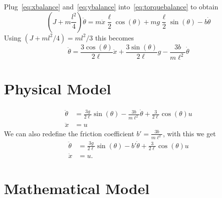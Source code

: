 \documentclass{article}
\begin{document}
Plug~\eqref{eq:xbalance} and~\eqref{eq:ybalance} into~\eqref{eq:torquebalance} to obtain
\begin{equation}
\left(J + m\frac{l^2}{4} \right) \ddot{\theta} = m \ddot{x} \frac{\ell}{2}\cos(\theta) + mg \frac{\ell}{2}\sin(\theta) - b\dot{\theta}
\end{equation}
Using $(J + ml^2/4) = ml^2/3$ this becomes
\begin{equation}
\ddot{\theta} = \frac{3 \cos(\theta)}{2 \ell} \ddot{x} + \frac{3 \sin(\theta)}{2\ell} g - \frac{3b}{m\ell^2} \dot{\theta}
\end{equation}

\section{Physical Model}
\begin{equation}
	\begin{aligned}
		\ddot{\theta} &= \frac{3g}{2\ell} \sin(\theta)    -\frac{3b}{m\ell^2} \dot{\theta}              + \frac{3}{2\ell} \cos(\theta)u\\
		\ddot{x} &= u 
	\end{aligned}
\end{equation}
We can also redefine the friction coefficient $b'=\frac{3b}{m\ell^2}$, with this we get
\begin{equation}
	\begin{aligned}
		\ddot{\theta} &= \frac{3g}{2\ell} \sin(\theta)    -b' \dot{\theta}              + \frac{3}{2\ell} \cos(\theta)u\\
		\ddot{x} &= u. 
	\end{aligned}
\end{equation}
\section{Mathematical Model}
\end{document}
